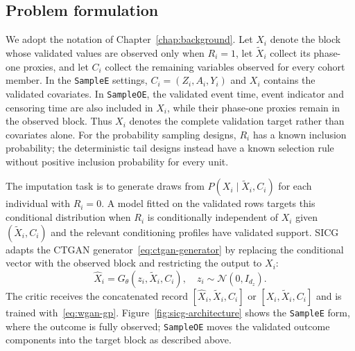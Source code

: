 \subsection{Problem formulation}
\label{sec:sicg_problem}

We adopt the notation of Chapter~\ref{chap:background}. Let $X_i$ denote the block whose validated values are observed only when $R_i=1$, let $\tilde X_i$ collect its phase-one proxies, and let $C_i$ collect the remaining variables observed for every cohort member. In the \texttt{SampleE} settings, $C_i=(Z_i,A_i,Y_i)$ and $X_i$ contains the validated covariates. In \texttt{SampleOE}, the validated event time, event indicator and censoring time are also included in $X_i$, while their phase-one proxies remain in the observed block. Thus $X_i$ denotes the complete validation target rather than covariates alone. For the probability sampling designs, $R_i$ has a known inclusion probability; the deterministic tail designs instead have a known selection rule without positive inclusion probability for every unit.

The imputation task is to generate draws from $P(X_i\mid\tilde X_i,C_i)$ for each individual with $R_i=0$. A model fitted on the validated rows targets this conditional distribution when $R_i$ is conditionally independent of $X_i$ given $(\tilde X_i,C_i)$ and the relevant conditioning profiles have validated support. SICG adapts the CTGAN generator~\eqref{eq:ctgan-generator} by replacing the conditional vector with the observed block and restricting the output to $X_i$:
\begin{equation}
\hat{X}_i = G_\theta(z_i, \tilde{X}_i, C_i), \quad z_i \sim \mathcal{N}(0, I_{d_z}).
\label{eq:sicg-generator}
\end{equation}
The critic receives the concatenated record $[\hat{X}_i,\tilde{X}_i,C_i]$ or $[X_i,\tilde{X}_i,C_i]$ and is trained with~\eqref{eq:wgan-gp}. Figure~\ref{fig:sicg-architecture} shows the \texttt{SampleE} form, where the outcome is fully observed; \texttt{SampleOE} moves the validated outcome components into the target block as described above.

